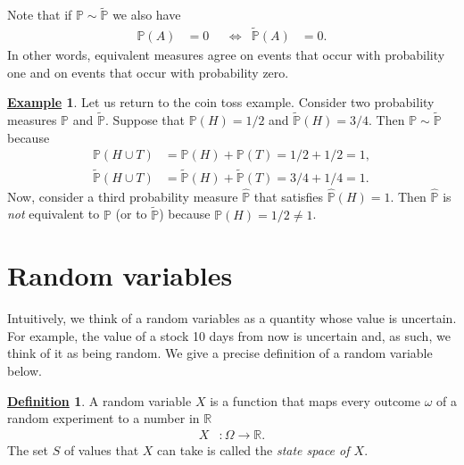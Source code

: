 \documentclass[12pt]{book}
\numberwithin{equation}{chapter}
\theoremstyle{plain}
\numberwithin{theorem}{section}
\theoremstyle{definition}
\newtheorem{definition}[theorem]{\underline{Definition}}
\newtheorem{example}[theorem]{\underline{Example}}
\numberwithin{exercise}{chapter}
\newcommand{\<}{\langle}
\renewcommand{\>}{\rangle}
\renewcommand{\(}{\left(}
\renewcommand{\)}{\right)}
\renewcommand{\[}{\left[}
\renewcommand{\]}{\right]}
\newcommand\Pb{\mathds{P}}
\newcommand\Rb{\mathds{R}}
\newcommand\om{\omega}
\newcommand\Om{\Omega}
\newcommand\Pbh{\widehat{\Pb}}
\newcommand\Pbt{\widetilde{\Pb}}
\theoremstyle{definition}
\numberwithin{question}{section}
\begin{document}
\noindent
Note that if $\Pb \sim \Pbt$ we also have
\begin{align}
\Pb(A)
	&=	0  &
	&\Leftrightarrow&
\Pbt(A)
	&=	0 .
\end{align}
In other words, equivalent measures agree on events that occur with probability one and on events that occur with probability zero.

\begin{example}
Let us return to the coin toss example.  Consider two probability measures $\Pb$ and $\Pbt$.  Suppose that $\Pb(H) = 1/2$ and $\Pbt(H) = 3/4$.  Then $\Pb \sim \Pbt$ because
\begin{align}
\Pb(H \cup T)
	&=	\Pb(H) + \Pb(T) 
	 =	1/2 + 1/2
	 =	1 , \\
\Pbt(H \cup T)
	&=	\Pbt(H) + \Pbt(T)
	 =	3/4 + 1/4
	 =	1 .
\end{align}
Now, consider a third probability measure $\Pbh$ that satisfies $\Pbh(H) = 1$.  Then $\Pbh$ is \textit{not} equivalent to $\Pb$ (or to $\Pbt$) because $\Pb(H) = 1/2 \neq 1$.
\end{example}


\section{Random variables}
\label{sec:rvs}

\noindent
Intuitively, we think of a random variables as a quantity whose value is uncertain.  For example, the value of a stock 10 days from now is uncertain and, as such, we think of it as being random.  We give a precise definition of a random variable below.

\begin{definition}
A random variable $X$ is a function that maps every outcome $\om$ of a random experiment to a number in $\Rb$
\begin{align}
X
	&: \Om \to \Rb .
\end{align}
The set $S$ of values that $X$ can take is called the \textit{state space of $X$}.
\end{definition}
\end{document}
